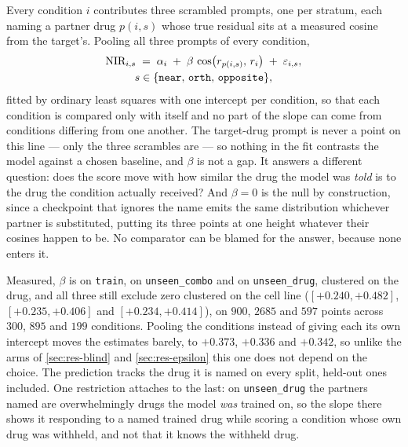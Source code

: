 Every condition $i$ contributes three scrambled prompts, one per stratum,
each naming a partner drug $p(i,s)$ whose true residual sits at a measured cosine
from the target's. Pooling all three prompts of every condition,
\begin{equation}
\begin{gathered}
 \textrm{NIR}_{i,s} \;=\; \alpha_i \;+\; \beta\,
   \cos\!\big(r_{p(i,s)},\, r_{i}\big) \;+\; \varepsilon_{i,s},
 \\
 s \in \{\texttt{near},\, \texttt{orth},\, \texttt{opposite}\},
\end{gathered}
\end{equation}
fitted by ordinary least squares with one intercept per condition, so that each
condition is compared only with itself and no part of the slope can come from
conditions differing from one another. The target-drug prompt is never a point on
this line --- only
the three scrambles are --- so nothing in the fit contrasts the model against a
chosen baseline, and $\beta$ is not a gap. It answers a different question: does
the score move with how similar the drug the model was \emph{told} is to the drug
the condition actually received? And $\beta = 0$ is the null by construction, since
a checkpoint that ignores the name emits the same distribution whichever partner
is substituted, putting its three points at one height whatever their cosines
happen to be. No comparator can be blamed for the answer, because none enters it.

Measured, $\beta$ is  on \texttt{train},
 on \texttt{unseen\_combo} and
 on \texttt{unseen\_drug}, clustered on the drug, and
all three still exclude zero clustered on the cell line ($[+0.240, +0.482]$,
$[+0.235, +0.406]$ and $[+0.234, +0.414]$), on $900$, $\num{2685}$ and $597$
points across $300$, $895$ and $199$ conditions. Pooling the conditions instead
of giving each its own intercept moves the estimates barely, to $+0.373$, $+0.336$
and $+0.342$, so unlike the arms of \cref{sec:res-blind} and
\cref{sec:res-epsilon} this one does not depend on the choice. The prediction tracks the drug it is named on every split,
held-out ones included. One restriction attaches to the last: on
\texttt{unseen\_drug} the partners named are overwhelmingly drugs the model
\emph{was} trained on, so the slope there shows it responding to a named trained
drug while scoring a condition whose own drug was withheld, and not that it knows
the withheld drug.



